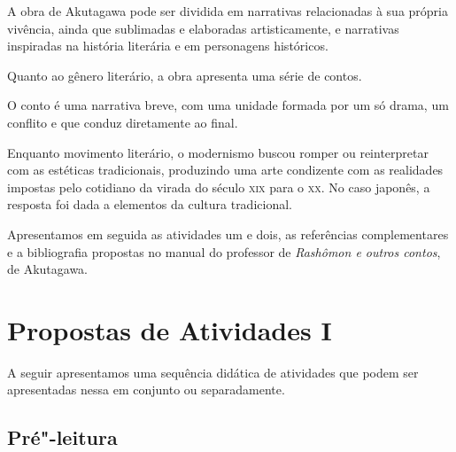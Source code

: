 \documentclass[12pt]{extarticle}
\begin{document}
A obra de Akutagawa pode ser dividida em narrativas relacionadas à sua própria
vivência, ainda que sublimadas e elaboradas artisticamente, e narrativas
inspiradas na história literária e em personagens históricos.
 
Quanto ao gênero literário, a obra apresenta uma série de contos.
 
O conto é uma narrativa breve, com uma unidade formada por um só drama, um
conflito e que conduz diretamente ao final.
 
Enquanto movimento literário, o modernismo buscou romper ou reinterpretar com
as estéticas tradicionais, produzindo uma arte condizente com as realidades
impostas pelo cotidiano da virada do século \textsc{xix} para o \textsc{xx}.  No caso japonês, a
resposta foi dada a elementos da cultura tradicional.


Apresentamos em seguida as atividades um e dois, as referências complementares
e a bibliografia propostas no manual do professor de \emph{Rashômon e outros contos},
de Akutagawa.

\section{Propostas de Atividades I}

A seguir apresentamos uma sequência didática de atividades que podem ser
apresentadas nessa em conjunto ou separadamente. 

\subsection{Pré"-leitura}
\end{document}

